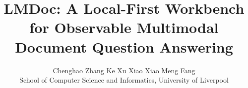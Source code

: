 \documentclass[11pt]{article}
\author{Chenghao Zhang \quad Ke Xu \quad Xiao Xiao \quad Meng Fang\\
School of Computer Science and Informatics, University of Liverpool}
\title{LMDoc: A Local-First Workbench for Observable Multimodal Document Question Answering}
\begin{document}
\maketitle
\raggedbottom


\appendix

\end{document}
